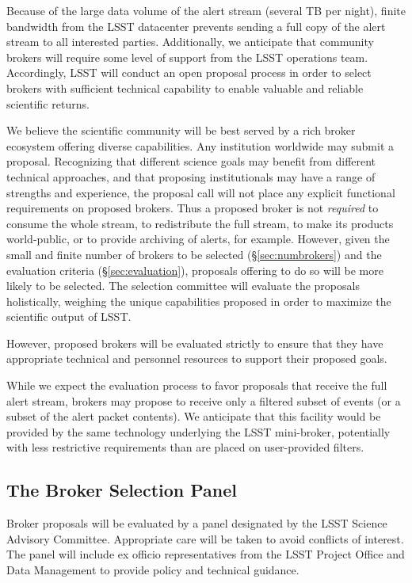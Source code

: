 Because of the large data volume of the alert stream (several TB per night), finite bandwidth from the LSST datacenter prevents sending a full copy of the alert stream to all interested parties.
Additionally, we anticipate that community brokers will require some level of support from the LSST operations team.
Accordingly, LSST will conduct an open proposal process in order to select brokers with sufficient technical capability to enable valuable and reliable scientific returns.

We believe the scientific community will be best served by a rich broker ecosystem offering diverse capabilities. 
Any institution worldwide may submit a proposal.
Recognizing that different science goals may benefit from different technical approaches, and that proposing institutionals may have a range of strengths and experience, the proposal call will not place any explicit functional requirements on proposed brokers.  
Thus a proposed broker is not \textit{required} to consume the whole stream, to redistribute the full stream, to make its products world-public, or to provide archiving of alerts, for example.
However, given the small and finite number of brokers to be selected (\S \ref{sec:numbrokers}) and the evaluation criteria (\S \ref{sec:evaluation}), proposals offering to do so will be more likely to be selected.
The selection committee will evaluate the proposals holistically, weighing the unique capabilities proposed in order to maximize the scientific output of LSST.

However, proposed brokers will be evaluated strictly to ensure that they have appropriate technical and personnel resources to support their proposed goals.

While we expect the evaluation process to favor proposals that receive the full alert stream, brokers may propose to receive only a filtered subset of events (or a subset of the alert packet contents).  
We anticipate that this facility would be provided by the same technology underlying the LSST mini-broker, potentially with less restrictive requirements than are placed on user-provided filters. 

\subsection{The Broker Selection Panel}

Broker proposals will be evaluated by a panel designated by the LSST Science Advisory Committee.  Appropriate care will be taken to avoid conflicts of interest.
The panel will include ex officio representatives from the LSST Project Office and Data Management to provide policy and technical guidance.

